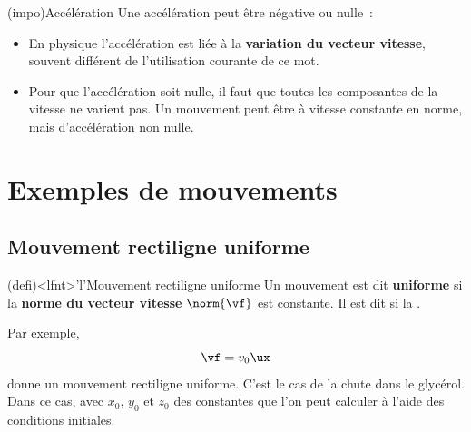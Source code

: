 \documentclass[../../main/main.tex]{subfiles}
\begin{document}
\begin{tcb}(impo){Accélération}
	Une accélération peut être négative ou nulle~:
	\begin{itemize}
		\item En physique l'accélération est liée à la \textbf{variation du
			      vecteur vitesse}, souvent différent de l'utilisation courante de ce
		      mot.
		\item Pour que l'accélération soit nulle, il faut que toutes les
		      composantes de la vitesse ne varient pas. Un mouvement peut être à
		      vitesse constante en norme, mais d'accélération non nulle.
	\end{itemize}
\end{tcb}

\section{Exemples de mouvements}

\subsection{Mouvement rectiligne uniforme}
\begin{tcb}(defi)<lfnt>'l'{Mouvement rectiligne uniforme}
	Un mouvement est dit \textbf{uniforme} si la \textbf{norme du vecteur vitesse}
	$\norm{\vf}$ est constante. Il est dit  si la .
\end{tcb}
Par exemple,
\[\vf = v_0\ux\]
donne un mouvement rectiligne uniforme. C'est le cas de la chute dans le
glycérol. Dans ce cas,
\psw{%
	\[
		\left\{
		\begin{array}{l}
			\xp(t) = v_0 \\
			\yp(t) = 0   \\
			\zp(t) = 0
		\end{array}
		\right.
		\Longrightarrow
		\left\{
		\begin{array}{l}
			x(t) = v_0t + x_0 \\
			y(t) = y_0        \\
			z(t) = z_0
		\end{array}
		\right.
	\]}
avec $x_0$, $y_0$ et $z_0$ des constantes que l'on peut calculer à l'aide des
conditions initiales.
\end{document}
